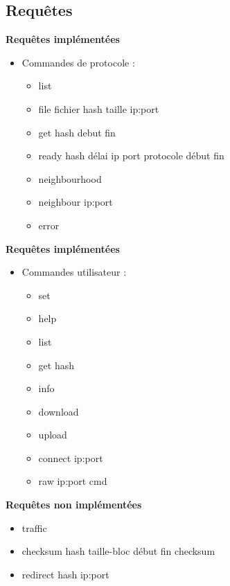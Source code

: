\documentclass{beamer}
\begin{document}
\begin{frame}
    \section{Requêtes}

    \textbf{Requêtes implémentées}
    \begin{itemize}
        \item Commandes de protocole :
            \begin{itemize}
                \item list
                \item file fichier hash taille ip:port
                \item get hash debut fin
                \item ready hash délai ip port protocole début fin
                \item neighbourhood
                \item neighbour ip:port
                \item error
            \end{itemize}
    \end{itemize}

\end{frame}

\begin{frame}
    \textbf{Requêtes implémentées}
    \begin{itemize}
        \item Commandes utilisateur :
            \begin{itemize}
                \item set
                \item help
                \item list
                \item get hash
                \item info
                \item download
                \item upload
                \item connect ip:port
                \item raw ip:port cmd
            \end{itemize}
    \end{itemize}
\end{frame}

\begin{frame}
    \textbf{Requêtes non implémentées}
    \begin{itemize}
        \item traffic
        \item checksum hash taille-bloc début fin checksum
        \item redirect hash ip:port
    \end{itemize}
\end{frame}
\end{document}
